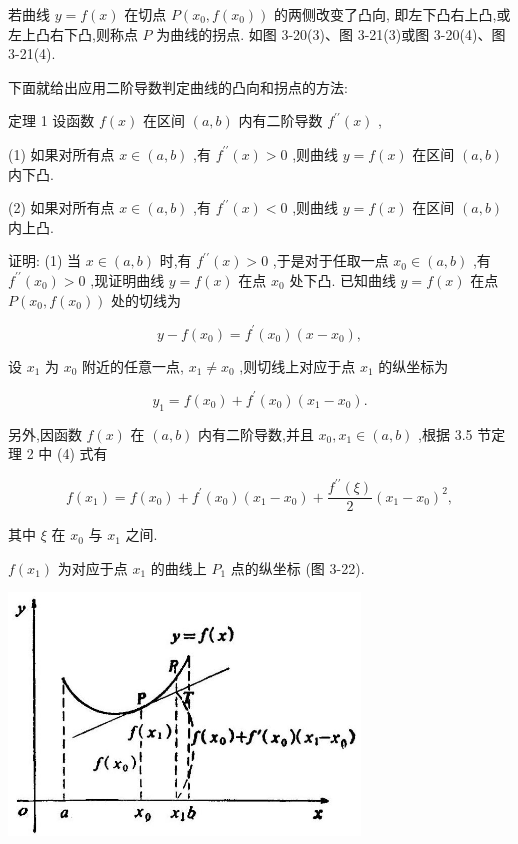 \documentclass[lang=cn,newtx,10pt,scheme=chinese]{elegantbook}
\begin{document}
若曲线 \(y = f\left( x\right)\) 在切点 \(P\left( {{x}_{0},f\left( {x}_{0}\right) }\right)\) 的两侧改变了凸向, 即左下凸右上凸,或左上凸右下凸,则称点 \(P\) 为曲线的拐点. 如图 3-20(3)、图 3-21(3)或图 3-20(4)、图 3-21(4).

下面就给出应用二阶导数判定曲线的凸向和拐点的方法:

定理 1 设函数 \(f\left( x\right)\) 在区间 \(\left( {a,b}\right)\) 内有二阶导数 \({f}^{\prime \prime }\left( x\right)\) ,

(1) 如果对所有点 \(x \in \left( {a,b}\right)\) ,有 \({f}^{\prime \prime }\left( x\right) > 0\) ,则曲线 \(y = f\left( x\right)\) 在区间 \(\left( {a,b}\right)\) 内下凸.

(2) 如果对所有点 \(x \in \left( {a,b}\right)\) ,有 \({f}^{\prime \prime }\left( x\right) < 0\) ,则曲线 \(y = f\left( x\right)\) 在区间 \(\left( {a,b}\right)\) 内上凸.

证明: (1) 当 \(x \in \left( {a,b}\right)\) 时,有 \({f}^{\prime \prime }\left( x\right) > 0\) ,于是对于任取一点 \({x}_{0} \in \left( {a,b}\right)\) ,有 \({f}^{\prime \prime }\left( {x}_{0}\right) > 0\) ,现证明曲线 \(y = f\left( x\right)\) 在点 \({x}_{0}\) 处下凸. 已知曲线 \(y = f\left( x\right)\) 在点 \(P\left( {{x}_{0},f\left( {x}_{0}\right) }\right)\) 处的切线为

\[
y - f\left( {x}_{0}\right) = {f}^{\prime }\left( {x}_{0}\right) \left( {x - {x}_{0}}\right) ,
\]

设 \({x}_{1}\) 为 \({x}_{0}\) 附近的任意一点, \({x}_{1} \neq {x}_{0}\) ,则切线上对应于点 \({x}_{1}\) 的纵坐标为

\[
{y}_{1} = f\left( {x}_{0}\right) + {f}^{\prime }\left( {x}_{0}\right) \left( {{x}_{1} - {x}_{0}}\right) . \tag{1}
\]

另外,因函数 \(f\left( x\right)\) 在 \(\left( {a,b}\right)\) 内有二阶导数,并且 \({x}_{0},{x}_{1} \in \left( {a,b}\right)\) ,根据 3.5 节定理 2 中 (4) 式有

\[
f\left( {x}_{1}\right) = f\left( {x}_{0}\right) + {f}^{\prime }\left( {x}_{0}\right) \left( {{x}_{1} - {x}_{0}}\right) + \frac{{f}^{\prime \prime }\left( \xi \right) }{2}{\left( {x}_{1} - {x}_{0}\right) }^{2}, \tag{2}
\]

其中 \(\xi\) 在 \({x}_{0}\) 与 \({x}_{1}\) 之间.

\(f\left( {x}_{1}\right)\) 为对应于点 \({x}_{1}\) 的曲线上 \({P}_{1}\) 点的纵坐标 (图 3-22).

\begin{center}
\includegraphics[max width=0.7\textwidth]{images/01912c18-5c3f-733d-b775-749ba9897a9d_167_239614.jpg}
\end{center}
\end{document}
